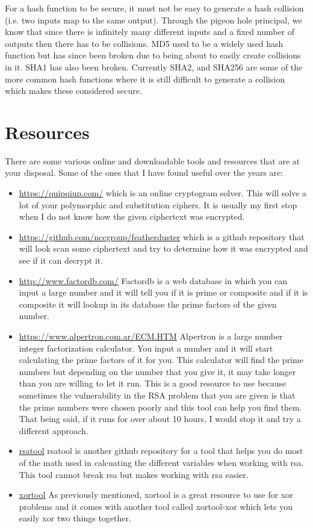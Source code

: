 \documentclass{report}
\begin{document}
For a hash function to be secure, it must not be easy to generate a hash collision
(i.e. two inputs map to the same output).  Through the pigeon hole principal, we
know that since there is infinitely many different inputs and a fixed number of
outputs then there has to be collisions.  MD5 used to be a widely used hash function
but has since been broken due to being about to easily create collisions in it.  SHA1
has also been broken.  Currently SHA2, and SHA256 are some of the more common hash 
functions where it is still difficult to generate a collision which makes these 
considered secure.

\section{Resources}
There are some various online and downloadable tools and resources that are at your disposal.  Some of the ones that I have found useful over the years are:
\begin{itemize}
\item \url{https://quipqiup.com/} which is an online cryptogram solver.  This will solve a lot of your polymorphic and substitution ciphers.  It is usually my first stop when I do not know how the given ciphertext was encrypted.  
\item \href{https://github.com/nccgroup/featherduster}{https://github.com/nccgroup/featherduster} which is a github repository that will look scan some ciphertext and try to determine how it was encrypted and see if it can decrypt it.  
\item \url{http://www.factordb.com/} Factordb is a web database in which you can input a large number and it will tell you if it is prime or composite and if it is composite it will lookup in its database the prime factors of the given number.  
\item \url{https://www.alpertron.com.ar/ECM.HTM} Alpertron is a large number integer factorization calculator.  You input a number and it will start calculating the prime factors of it for you.  This calculator will find the prime numbers but depending on the number that you give it, it may take longer than you are willing to let it run.  This is a good resource to use because sometimes the vulnerability in the RSA problem that you are given is that the prime numbers were chosen poorly and this tool can help you find them.  That being said, if it runs for over about 10 hours, I would stop it and try a different approach. 
\item \href{https://github.com/ius/rsatool}{rsatool} rsatool is another github repository for a tool that helps you do most of the math used in calcuating the different variables when working with rsa.  This tool cannot break rsa but makes working with rsa easier.
\item \href{https://github.com/hellman/xortool}{xortool} As previously mentioned, xortool is a great resource to use for xor problems and it comes with another tool called xortool-xor which lets you easily xor two things together.
\end{itemize}
\end{document}
